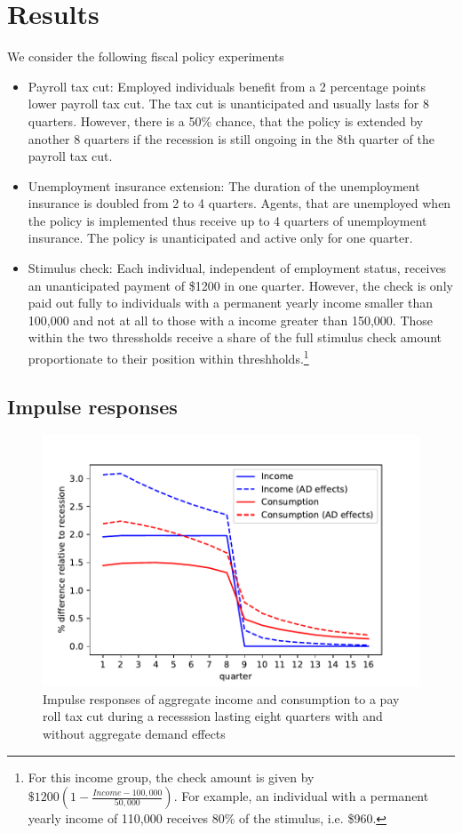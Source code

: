 \section{Results}

We consider the following fiscal policy experiments

\begin{itemize}
	\item Payroll tax cut: Employed individuals benefit from a 2 percentage points lower payroll tax cut. The tax cut is unanticipated and usually lasts for 8 quarters. However, there is a 50\% chance, that the policy is extended by another 8 quarters if the recession is still ongoing in the 8th quarter of the payroll tax cut. 
	\item Unemployment insurance extension: The duration of the unemployment insurance is doubled from 2 to 4 quarters. Agents, that are unemployed when the policy is implemented thus receive up to 4 quarters of unemployment insurance. The policy is unanticipated and active only for one quarter.
	\item Stimulus check: Each individual, independent of employment status, receives an unanticipated payment of \$1200 in one quarter. However, the check is only paid out fully to individuals with a permanent yearly income smaller than 100,000 and not at all to those with a income greater than 150,000. Those within the two thressholds receive a share of the full stimulus check amount proportionate to their position within threshholds.\footnote{For this income group, the check amount is given by $\$1200 (1-\frac{Income-100,000}{50,000})$. For example, an individual with a permanent yearly income of 110,000 receives 80\% of the stimulus, i.e. \$960.}
\end{itemize}

\subsection{Impulse responses}


\begin{figure}
	\centering
	\includegraphics[width=0.8\linewidth]{../Code/HA-Models/FromPandemicCode/Figures/recession_taxcut_relrecession}
	\caption{Impulse responses of aggregate income and consumption to a pay roll tax cut during a recesssion lasting eight quarters with and without aggregate demand effects}
	\label{fig:recessiontaxcutrelrecession}
\end{figure}

